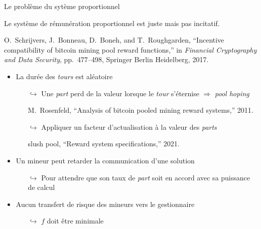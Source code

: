\documentclass{beamer}
\begin{document}
\begin{frame}{Le problème du sytème proportionnel}
\scriptsize
\begin{tcolorbox}[enhanced,drop shadow, title=Remarque]
Le système de rémunération proportionnel est juste mais pas incitatif.
\end{tcolorbox}
\tiny
\begin{thebibliography}{1}

O.~Schrijvers, J.~Bonneau, D.~Boneh, and T.~Roughgarden, ``Incentive
  compatibility of bitcoin mining pool reward functions,'' in {\em Financial
  Cryptography and Data Security}, pp.~477--498, Springer Berlin Heidelberg,
  2017.

\end{thebibliography}
\scriptsize

\begin{itemize}
  \item La durée des \textit{tours} est aléatoire 
  \begin{itemize}
    \scriptsize
    \item[$\hookrightarrow$] Une \textit{part} perd de la valeur lorsque le \textit{tour} s'éternise $\Rightarrow$ \textit{pool hoping} \tiny
    \begin{thebibliography}{1}

M.~Rosenfeld, ``Analysis of bitcoin pooled mining reward systems,'' 2011.

\end{thebibliography}
\scriptsize
    \item[$\hookrightarrow$] Appliquer un facteur d'actualisation à la valeur des \textit{parts} \tiny
    \begin{thebibliography}{1}
slush pool, ``Reward system specifications,'' 2021.
\end{thebibliography}
  \end{itemize}
  \item Un mineur peut retarder la communication d'une solution
  \begin{itemize}
    \scriptsize
    \item[$\hookrightarrow$] Pour attendre que son taux de \textit{part} soit en accord avec sa puissance de calcul 
  \end{itemize} 
  \item Aucun transfert de risque des mineurs vers le gestionnaire
    \begin{itemize}
    \scriptsize
    \item[$\hookrightarrow$] $f$ doit être minimale
  \end{itemize} 
\end{itemize}
\end{frame}
\end{document}

